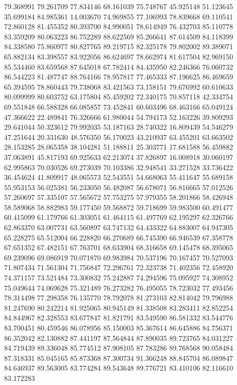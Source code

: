 79.368991
79.261709
77.834146
68.161039
75.748767
45.925148
51.123645
35.699184
84.985361
14.003670
74.969855
77.106993
78.839668
69.110541
72.860128
81.455352
80.393700
84.990051
78.614949
76.432703
85.110778
83.359209
80.063223
86.752289
88.622569
85.266641
87.614509
84.118399
84.338580
75.860977
80.827765
89.219715
82.325178
79.802002
89.389071
65.882134
83.398557
83.922056
86.624697
78.662974
81.617504
82.969150
85.534460
83.659568
87.645018
67.782414
84.435950
82.246366
76.060732
86.544223
81.487747
88.764166
78.957817
77.465333
87.196625
86.469659
65.394595
78.860443
79.738068
83.421563
73.158151
79.676992
60.610633
80.099999
80.603752
63.175804
85.459202
72.340175
70.857118
42.334754
69.551848
66.588328
66.085857
73.452841
60.603496
68.463166
65.049124
47.366622
22.489841
76.326666
61.980044
54.794173
52.163226
39.809293
29.641044
50.323612
79.992035
53.187163
28.740322
16.809439
54.546279
47.251644
20.331630
48.576350
56.170023
43.210937
63.455201
63.663502
28.153285
28.065358
38.104281
51.188811
25.303771
17.681588
56.459882
37.063891
45.817193
69.925633
62.213074
37.826897
16.008918
30.060197
62.995863
70.030526
69.273039
70.103386
32.948541
33.271528
33.736422
36.454624
41.809917
48.065573
52.543551
54.668063
55.411647
55.689158
55.953153
56.025381
56.233050
56.482087
56.678071
56.816665
57.012526
57.260697
57.335107
57.565672
57.753275
57.979355
58.201866
58.426948
58.589068
58.882983
59.177450
59.568872
59.718699
59.983500
60.491477
60.415099
61.179766
61.303051
61.464115
61.497769
62.195297
62.326766
62.863370
63.007731
63.560897
63.747132
64.433322
64.883007
64.947305
65.228275
65.512004
66.228820
66.270689
66.745390
66.946539
67.358778
67.651352
67.482151
67.763701
68.633904
68.316658
69.145478
68.395065
69.239096
69.086919
70.071870
69.983984
70.537196
70.167457
70.527093
71.807434
71.561304
71.756847
72.296761
72.323738
71.402356
72.458920
74.371157
73.521484
73.300832
75.242887
74.294596
75.095927
74.308952
75.049644
74.069628
75.321489
76.273282
76.495055
78.723032
77.493456
78.314498
77.298358
76.135770
78.792078
81.273103
82.814042
79.796988
81.247690
80.242214
81.925065
80.945149
81.338508
83.283411
82.852254
84.844967
82.328553
83.677847
81.821791
83.549590
86.581332
83.544776
83.700451
80.459546
86.078956
85.150003
85.367614
86.645886
84.756371
86.352042
82.130882
87.441197
87.564844
87.890035
89.723765
84.031227
84.719439
89.336048
85.774512
87.908105
87.783286
89.768568
90.058484
87.318331
85.045165
85.873368
87.300734
91.366248
88.845704
86.089847
84.646937
89.563005
83.774284
89.543648
89.776721
83.410106
82.116610
83.172283
